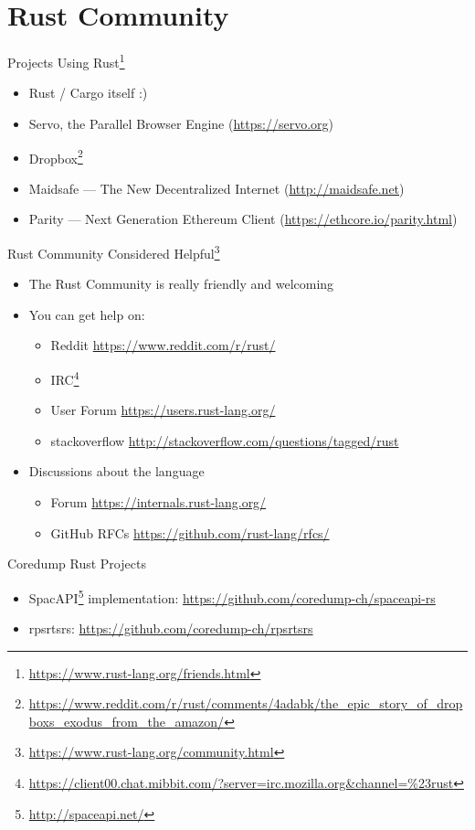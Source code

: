 \section{Rust Community}

\begin{frame}{Projects Using Rust\footnote{\url{https://www.rust-lang.org/friends.html}}}
\begin{itemize}
\item Rust / Cargo itself :)
\item Servo, the Parallel Browser Engine (\url{https://servo.org})
\item Dropbox\footnote{\url{https://www.reddit.com/r/rust/comments/4adabk/the_epic_story_of_dropboxs_exodus_from_the_amazon/}}
\item Maidsafe --- The New Decentralized Internet (\url{http://maidsafe.net})
\item Parity --- Next Generation Ethereum Client (\url{https://ethcore.io/parity.html})
\end{itemize}
\end{frame}

\begin{frame}{Rust Community Considered Helpful\footnote{\url{https://www.rust-lang.org/community.html}}}
\begin{itemize}
\item The Rust Community is really friendly and welcoming
\item You can get help on:
    \begin{itemize}
        \item Reddit {\url{https://www.reddit.com/r/rust/}}
        \item IRC\footnote{\url{https://client00.chat.mibbit.com/?server=irc.mozilla.org&channel=\%23rust}}
        \item User Forum \url{https://users.rust-lang.org/}
        \item stackoverflow \url{http://stackoverflow.com/questions/tagged/rust}
    \end{itemize}
\item Discussions about the language
    \begin{itemize}
        \item Forum \url{https://internals.rust-lang.org/}
        \item GitHub RFCs \url{https://github.com/rust-lang/rfcs/}
    \end{itemize}
\end{itemize}
\end{frame}

\begin{frame}{Coredump Rust Projects}
\begin{itemize}
    \item SpacAPI\footnote{\url{http://spaceapi.net/}} implementation: \url{https://github.com/coredump-ch/spaceapi-rs}
    \item rpsrtsrs: \url{https://github.com/coredump-ch/rpsrtsrs}
\end{itemize}
\end{frame}
